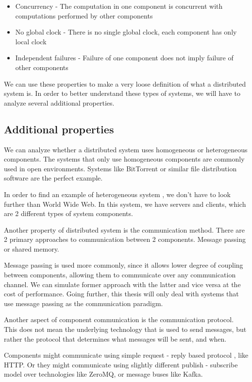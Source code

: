 \begin{itemize}
    \item Concurrency - The computation in one component is concurrent with computations performed by other components
    \item No global clock - There is no single global clock, each component has only local clock
    \item Independent failures - Failure of one component does not imply failure of other components
\end{itemize}

We can use these properties to make a very loose definition of what a distributed system is. In order to better understand these
types of systems, we will have to analyze several additional properties.

\subsection{Additional properties}
We can analyze whether a distributed system uses homogeneous or heterogeneous components.
The systems that only use homogeneous components are commonly used in open environments.
Systems like BitTorrent or similar file distribution software are the perfect example.

In order to find an example of heterogeneous system , we don't have to look further than World Wide Web. In this system,
we have servers and clients, which are 2 different types of system components.

Another property of distributed system is the communication method. There are 2 primary approaches to communication between 2 components. Message passing or shared
memory.

Message passing is used more commonly, since it allows lower degree of coupling between components, allowing them to communicate
over any communication channel. We can simulate former approach with the latter and vice versa at the cost of performance.
Going further, this thesis will only deal with systems that use message passing as the communication paradigm.

Another aspect of component communication is the communication protocol. This does not mean the underlying technology that is used to send
messages, but rather the protocol that determines what messages will be sent, and when.

Components might communicate using simple request - reply based protocol , like HTTP. Or they might communicate using slightly different
publish - subscribe model over technologies like ZeroMQ, or message buses like Kafka.

